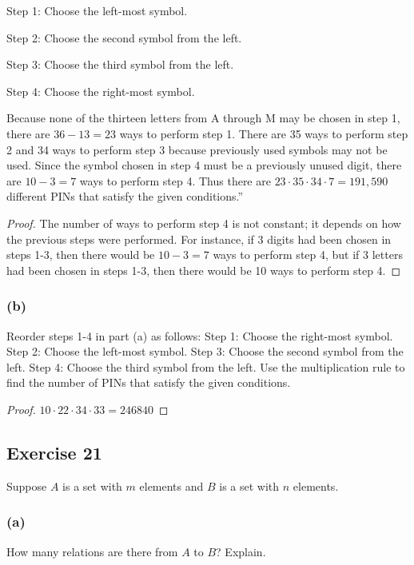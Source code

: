 \documentclass[14pt]{extarticle}
\newcommand{\cy}{\color{cyan}}
\begin{document}
Step 1: Choose the left-most symbol.

Step 2: Choose the second symbol from the left.

Step 3: Choose the third symbol from the left.

Step 4: Choose the right-most symbol.

Because none of the thirteen letters from A through M may be chosen in step 1, there are \(36 - 13 = 23\) ways to
perform step 1. There are 35 ways to perform step 2 and 34 ways to perform step 3 because previously used symbols may
not be used. Since the symbol chosen in step 4 must be a previously unused digit, there are \(10 - 3 = 7\) ways to
perform step 4. Thus there are \(23 \cdot 35 \cdot 34 \cdot 7 = 191,590\) different PINs that satisfy the given
conditions.”

\begin{proof}
     The number of ways to perform step 4 is not constant; it depends on how the previous steps were performed. For
     instance, if 3 digits had been chosen in steps 1-3, then there would be \(10 - 3 = 7\) ways to perform step 4, but
     if 3 letters had been chosen in steps 1-3, then there would be 10 ways to perform step 4.
\end{proof}

\subsubsection{(b)}
Reorder steps 1-4 in part (a) as follows: {\cy Step 1:} Choose the right-most symbol. {\cy Step 2:} Choose the
left-most symbol. {\cy Step 3:} Choose the second symbol from the left. {\cy Step 4:} Choose the third symbol from
the left. Use the multiplication rule to find the number of PINs that satisfy the given conditions.

\begin{proof}
     \(10 \cdot 22 \cdot 34 \cdot 33 = 246840\)
\end{proof}

\subsection{Exercise 21}
Suppose $A$ is a set with $m$ elements and $B$ is a set with $n$ elements.

\subsubsection{(a)}
How many relations are there from $A$ to $B$? Explain.
\end{document}
